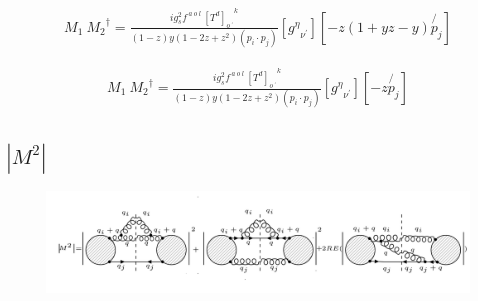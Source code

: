 \begin{equation}
\begin{split}
M_1\:{M_2}^{\dagger}=\frac{ig_s ^2 f^{\:a\:o\:l}\: {[T^d]_{o\:^{\prime}}}^k}{(1-z)y(1-2z+z^2)(p_i \cdot p_j)}
[{g^{{\eta}}}_{{\nu}^{\prime}}][
-z(1+yz-y) \not{p_j}]
\end{split}
\end{equation}

\begin{equation}
\begin{split}
M_1\:{M_2}^{\dagger}=\frac{ig_s ^2 f^{\:a\:o\:l}\: {[T^d]_{o\:^{\prime}}}^k}{(1-z)y(1-2z+z^2)(p_i \cdot p_j)}
[{g^{{\eta}}}_{{\nu}^{\prime}}][-z\not{p_j}]
\end{split}
\end{equation}
\pagebreak

\subsection{$|M^{2}|$}
\begin{figure}[ht!]
\centering
\includegraphics[width=1.0\textwidth]{images/ggq-MSquerRE.png}

\end{figure}
